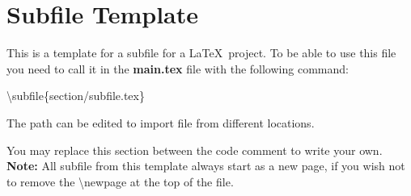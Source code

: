 \documentclass[../main.tex]{subfiles}
\begin{document}
\clearpage
\thispagestyle{empty}


\section{Subfile Template}

This is a template for a subfile for a \LaTeX\ project.
To be able to use this file you need to call it in the \textbf{main.tex} file with the following command:

\begin{center}
	\textbackslash subfile\{section/subfile.tex\}
\end{center}

The path can be edited to import file from different locations.

You may replace this section between the code comment to write your own.\\

\textbf{Note:} All subfile from this template always start as a new page, if you wish not to remove the \textbackslash newpage at the top of the file.

	
	
\end{document}
